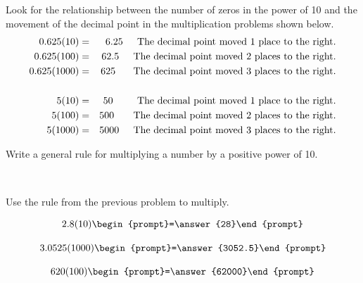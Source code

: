 \documentclass{ximera}
\begin{document}
Look for the relationship between the number of zeros in the power of 10 and the movement of the decimal point in the multiplication problems shown below.
\begin{eqnarray*}
0.625 (10) &=& 6.25 \hspace{0.2in} \textrm{The decimal point moved 1 place to the right.} \\
0.625 (100) &=&  62.5  \hspace{0.2in} \textrm{The decimal point moved 2 places to the right.} \\
0.625 (1000) &=& 625 \hspace{0.25in} \textrm{The decimal point moved 3 places to the right.}\\
& & \\
5 (10) &=& 50 \hspace{0.34in} \textrm{The decimal point moved 1 place to the right.} \\
5 (100) &=&  500  \hspace{0.27in} \textrm{The decimal point moved 2 places to the right.} \\
5 (1000) &=& 5000 \hspace{0.2in} \textrm{The decimal point moved 3 places to the right.}
\end{eqnarray*}

\begin{problem} Write a general rule for multiplying a number by a positive power of 10.

~ \\[1em]  %

\begin{multipleChoice}
  \end{multipleChoice}

\end{problem}


\begin{center}
\end{center}

\begin{problem}  Use the rule from the previous problem to multiply.

\[ 2.8 (10) \begin{prompt}=\answer{28}\end{prompt} \]


\[ 3.0525 (1000) \begin{prompt}=\answer{3052.5}\end{prompt} \]

\[ 620 (100) \begin{prompt}=\answer{62000}\end{prompt} \]

\end{problem}
\end{document}
